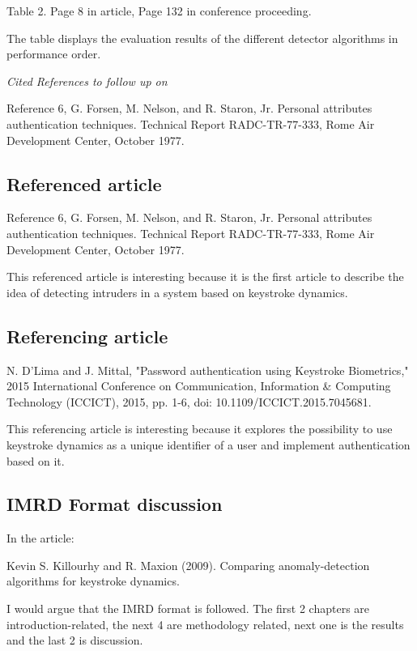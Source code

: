 \documentclass[11pt, a4paper]{article}
\begin{document}
Table 2. Page 8 in article, Page 132 in conference proceeding.

The table displays the evaluation results of the different detector algorithms in performance order.

\vspace{2mm}\noindent\textit{Cited References to follow up on}

Reference 6, 
G. Forsen, M. Nelson, and R. Staron,
Jr. Personal attributes authentication techniques. Technical Report RADC-TR-77-333,
Rome Air Development Center,
October 1977.

\subsection{Referenced article}

Reference 6, 
G. Forsen, M. Nelson, and R. Staron,
Jr. Personal attributes authentication techniques. Technical Report RADC-TR-77-333,
Rome Air Development Center,
October 1977.

This referenced article is interesting because it is the first article to describe the idea of detecting
intruders in a system based on keystroke dynamics.

\subsection{Referencing article}

N. D'Lima and J. Mittal,
"Password authentication using Keystroke Biometrics," 2015 International Conference on Communication,
Information \& Computing Technology (ICCICT),
2015,
pp. 1-6, doi: 10.1109/ICCICT.2015.7045681.

This referencing article is interesting because it explores the possibility to use keystroke dynamics as
a unique identifier of a user and implement authentication based on it.

\subsection{IMRD Format discussion}

In the article:

Kevin S. Killourhy and R. Maxion (2009). Comparing anomaly-detection algorithms for keystroke dynamics.

I would argue that the IMRD format is followed. The first 2 chapters are introduction-related,
the next 4 are methodology related, next one is the results and the last 2 is discussion.
\end{document}
